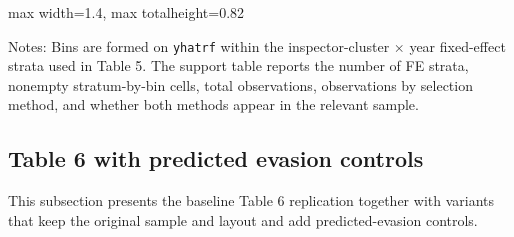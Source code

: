 \documentclass{article}
\newcommand{\OutPath}{Output/}%
\newcommand{\OutPath}{../Output/}%
\begin{document}
\begin{landscape}
\begin{table}[H]
\begin{adjustbox}{max width=1.4\textwidth, max totalheight=0.82\textheight}
\begin{threeparttable}
\scriptsize


\begin{tablenotes}[flushleft]
\scriptsize
\item Notes: Bins are formed on \texttt{yhatrf} within the inspector-cluster $\times$ year fixed-effect strata used in Table 5. The support table reports the number of FE strata, nonempty stratum-by-bin cells, total observations, observations by selection method, and whether both methods appear in the relevant sample.
\end{tablenotes}
\end{threeparttable}
\end{adjustbox}
\end{table}

\end{landscape}

\subsection{Table 6 with predicted evasion controls}

This subsection presents the baseline Table 6 replication together with variants that keep the original sample and layout and add predicted-evasion controls.
\end{document}
